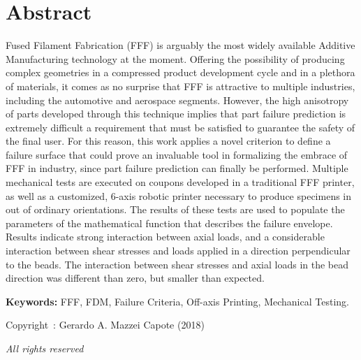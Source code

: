 \documentclass[main.tex]{subfiles}
\begin{document}
\setcounter{page}{1}
\chapter*{Abstract}
Fused Filament Fabrication (FFF) is arguably the most widely available Additive Manufacturing technology at the moment. Offering the possibility of producing complex geometries in a compressed product development cycle and in a plethora of materials, it comes as no surprise that FFF is attractive to multiple industries, including the automotive and aerospace segments. However, the high anisotropy of parts developed through this technique implies that part failure prediction is extremely difficult \textemdash a requirement that must be satisfied to guarantee the safety of the final user. For this reason, this work applies a novel criterion to define a failure surface that could prove an invaluable tool in formalizing the embrace of FFF in industry, since part failure prediction can finally be performed. Multiple mechanical tests are executed on coupons developed in a traditional FFF printer, as well as a customized, 6-axis robotic printer necessary to produce specimens in out of ordinary orientations. The results of these tests are used to populate the parameters of the mathematical function that describes the failure envelope. Results indicate strong interaction between axial loads, and a considerable interaction between shear stresses and loads applied in a direction perpendicular to the beads. The interaction between shear stresses and axial loads in the bead direction was different than zero, but smaller than expected.
 
\vspace{10mm} %
\textbf{Keywords:} FFF, FDM, Failure Criteria, Off-axis Printing, Mechanical Testing.

\vfill %
\begin{center}
Copyright~\textcopyright: Gerardo A. Mazzei Capote (2018)

\emph{All rights reserved}	
\end{center}
\end{document}
